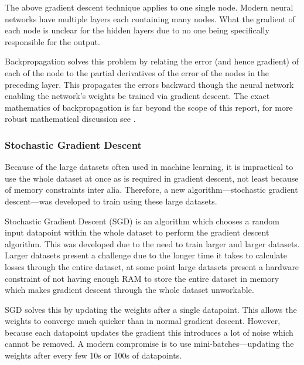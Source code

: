 \documentclass[a4paper,fleqn,usenatbib]{mnras}
\begin{document}
The above gradient descent technique applies to one single node. Modern neural networks have multiple layers each containing many nodes. What the gradient of each node is unclear for the hidden layers due to no one being specifically responsible for the output. 

Backpropagation solves this problem by relating the error (and hence gradient) of each of the node to the partial derivatives of the error of the nodes in the preceding layer. This propagates the errors backward though the neural network enabling the network's weights be trained via gradient descent. The exact mathematics of backpropagation is far beyond the scope of this report, for more robust mathematical discussion see \citep{Backpropagation}.

\subsubsection{Stochastic Gradient Descent}
Because of the large datasets often used in machine learning, it is impractical to use the whole dataset at once as is required in gradient descent, not least because of memory constraints inter alia. Therefore, a new algorithm---stochastic gradient descent---was developed to train using these large datasets.

Stochastic Gradient Descent (SGD) is an algorithm which chooses a random input datapoint within the whole dataset to perform the gradient descent algorithm. This was developed due to the need to train larger and larger datasets. Larger datasets present a challenge due to the longer time it takes to calculate losses through the entire dataset, at some point large datasets present a hardware constraint of not having enough RAM to store the entire dataset in memory which makes gradient descent through the whole dataset unworkable. 

SGD solves this by updating the weights after a single datapoint. This allows the weights to converge much quicker than in normal gradient descent. However, because each datapoint updates the gradient this introduces a lot of noise which cannot be removed. A modern compromise is to use mini-batches---updating the weights after every few 10s or 100s of datapoints. \citep{SGD}
\end{document}
